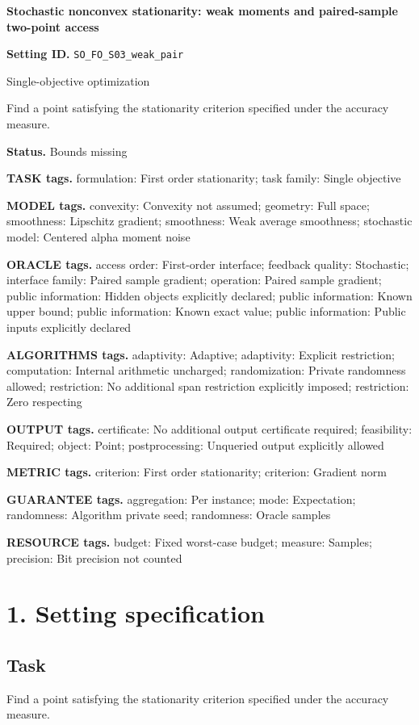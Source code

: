 \documentclass[10pt,a4paper]{article}
\begin{document}
\raggedright

{\LARGE\bfseries\sffamily\color{AtlasNavy} Stochastic nonconvex stationarity: weak moments and paired-sample two-point access\par}\vspace{5pt}
\textbf{Setting ID.} \texttt{SO\_\allowbreak{}FO\_\allowbreak{}S03\_\allowbreak{}weak\_\allowbreak{}pair}

Single-objective optimization

Find a point satisfying the stationarity criterion specified under the accuracy measure.

\textbf{Status.} Bounds missing

\textbf{TASK tags.} formulation: First order stationarity; task family: Single objective

\textbf{MODEL tags.} convexity: Convexity not assumed; geometry: Full space; smoothness: Lipschitz gradient; smoothness: Weak average smoothness; stochastic model: Centered alpha moment noise

\textbf{ORACLE tags.} access order: First-order interface; feedback quality: Stochastic; interface family: Paired sample gradient; operation: Paired sample gradient; public information: Hidden objects explicitly declared; public information: Known upper bound; public information: Known exact value; public information: Public inputs explicitly declared

\textbf{ALGORITHMS tags.} adaptivity: Adaptive; adaptivity: Explicit restriction; computation: Internal arithmetic uncharged; randomization: Private randomness allowed; restriction: No additional span restriction explicitly imposed; restriction: Zero respecting

\textbf{OUTPUT tags.} certificate: No additional output certificate required; feasibility: Required; object: Point; postprocessing: Unqueried output explicitly allowed

\textbf{METRIC tags.} criterion: First order stationarity; criterion: Gradient norm

\textbf{GUARANTEE tags.} aggregation: Per instance; mode: Expectation; randomness: Algorithm private seed; randomness: Oracle samples

\textbf{RESOURCE tags.} budget: Fixed worst-case budget; measure: Samples; precision: Bit precision not counted

\section{1. Setting specification}
\subsection{Task}
Find a point satisfying the stationarity criterion specified under the accuracy measure.
\end{document}
